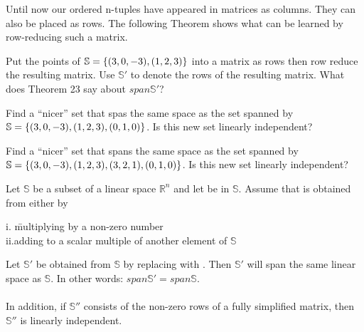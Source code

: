 Until now our ordered n-tuples have appeared in matrices as columns.  They can also be placed as rows. The following Theorem shows what can be learned by row-reducing such a matrix. 

\begin{myexa}[\bd{a}]
	Put the points of $\mathbb{S} = \{ ({3},{0},{-3}), ({1},{2},{3})  \}$ into a matrix as rows then row reduce the resulting matrix. Use $\mathbb{S}'$ to denote the rows of the resulting matrix. What does Theorem 23 say about $span\mathbb{S}'$?
\end{myexa}

\begin{myexb}[\bd{b}]
	Find a ``nicer'' set that spas the same space as the set spanned by $\mathbb{S} = \{ ({3},{0},{-3}), ({1},{2},{3}),({0},{1},{0})  \}$. Is this new set linearly independent?
\end{myexb}

\begin{myexc}[\bd{c}]
    Find a ``nicer'' set that spans the same space as the set spanned by $\mathbb{S} = \{ ({3},{0},{-3}), ({1},{2},{3}), ({3},{2},{1}) ,({0},{1},{0})  \}$. Is this new set linearly independent?
\end{myexc}

\begin{theorem}
	Let $\mathbb{S}$ be a subset of a linear space $\mathbb{R}^n$ and let  be in $\mathbb{S}$. Assume that  is obtained from  either by 
	 \begin{tabbing}
	 	\indent i. \quad  \= multiplying  by a non-zero number \quad  {}\\
	 	\indent ii.\>adding to  a scalar multiple of another element of $\mathbb{S}$ 
	 	 \end{tabbing}
	Let $\mathbb{S}'$ be obtained from $\mathbb{S}$ by replacing  with . Then $\mathbb{S}'$ will span the same linear space as $\mathbb{S}$. In other words: $span\mathbb{S}' = span\mathbb{S}$.\\ \\
	In addition, if $\mathbb{S}''$ consists of the non-zero rows of a fully simplified matrix, then $\mathbb{S}''$ is linearly independent.
\end{theorem}
\vspace{-.3in}\hspace{5in}\begin{annotation}
\end{annotation}



